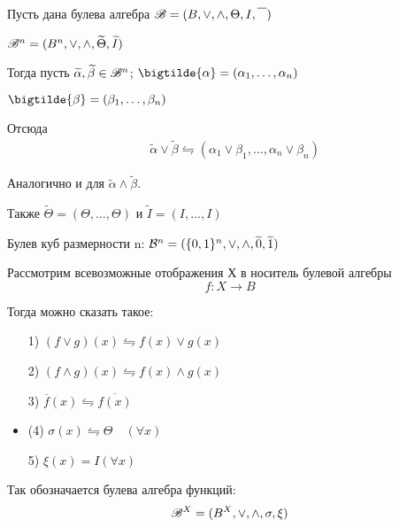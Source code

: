 

\title{}
\author{Козырнов Александр Дмитриевич, ИУ7-32Б}
\date{\today}


Пусть дана булева алгебра $\mathscr{B} = (B, \lor,\land, \Theta, I, \overline{\phantom{A}})$ 

$\mathscr{B}^{n} = (B^{n},\lor,\land, \widetilde{\Theta}, \widetilde{I})$ 

Тогда пусть $\widetilde{\alpha}, \widetilde{\beta} \in \mathscr{B}^{n}$;
$\bigtilde{\alpha} = (\alpha_1,\ldots,\alpha_{n})$ 

$\bigtilde{\beta} = (\beta_1,\ldots,\beta_{n})$ 

Отсюда 
\begin{align*}
    &\widetilde{\alpha} \lor \widetilde{\beta} \leftrightharpoons
    (\alpha_1 \lor \beta_1, \ldots, \alpha_{n} \lor \beta_{n})
\end{align*}

Аналогично и для $\widetilde{\alpha} \land \widetilde{\beta}$.

\medskip

Также  $\widetilde{\Theta} = (\Theta, \ldots, \Theta)$ и
$\widetilde{I} = (I, \ldots, I)$

 \begin{definition}
 Булев куб размерности n: ${\cal B}^{n} = (\{0,1\}^{n}, \lor, \land,
 \widetilde{0}, \widetilde{1})$
 \end{definition}


\medskip

Рассмотрим всевозможные отображения Х в носитель булевой алгебры
\[
f: X \to B
\]

Тогда можно сказать такое:
\begin{itemize}
    \item[1)] $(f \lor g)(x) \leftrightharpoons f(x) \lor g(x)$
    \item[2)] $(f \land g)(x) \leftrightharpoons f(x) \land g(x)$
    \item[3)] $\overline{f}(x) \leftrightharpoons \overline{f(x)}$ 
    \item(4) $\sigma(x) \leftrightharpoons \Theta \quad (\forall x)$ 
    \item[5)] $\xi(x) = I(\forall x)$
\end{itemize}


\medskip

\begin{definition}
Так обозначается булева алгебра функций:
\[
\mathscr{B}^{X} = (B^{X}, \lor,\land, \sigma, \xi)
\] 
\end{definition}

